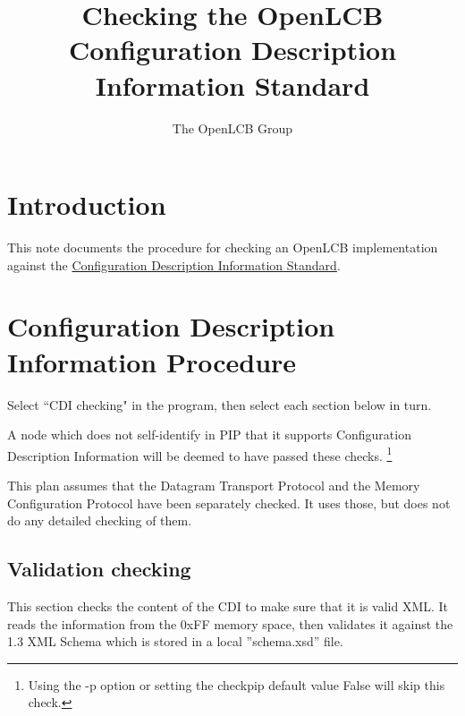 \documentclass[11pt]{article}
\title{Checking the OpenLCB Configuration Description Information Standard}
\author{The OpenLCB Group}
\begin{document}
\maketitle


\section{Introduction}

This note documents the procedure for checking an OpenLCB implementation against the 
\href{https://nbviewer.org/github/openlcb/documents/blob/master/standards/ConfigurationDescriptionInformationS.pdf}
    {Configuration Description Information Standard}.



\section{Configuration Description Information Procedure}

Select ``CDI checking" in the program, 
then select each section below in turn.

A node which does not self-identify in PIP that it supports
Configuration Description Information will be deemed to have passed these checks.
\footnote{Using the -p option or setting the checkpip default value False will skip this check.}

This plan assumes that the Datagram Transport Protocol and the Memory Configuration Protocol 
have been separately checked. It uses those, but does not do any detailed checking of them.

\subsection{Validation checking}

This section checks the content of the CDI to make sure that it is valid XML. 
It reads the information from the 0xFF memory space, 
then validates it against the 1.3 XML Schema which is stored in a local ”schema.xsd” file.
\end{document}
